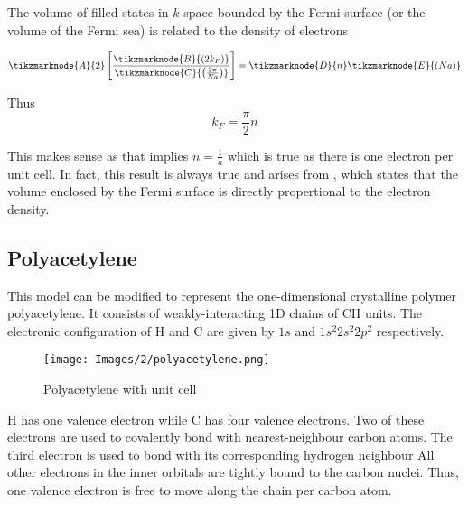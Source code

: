 \documentclass[12pt,a4paper,titlepage]{article}
\newcommand{\ul}[1]{\underline{\smash{#1}}} %
\begin{document}
The volume of filled states in $k$-space bounded by the Fermi surface (or the volume of the Fermi sea) is related to the density of electrons

\begin{equation}
	\tikzmarknode{A}{2}\left[\frac{\tikzmarknode{B}{(2k_{F})}}{\tikzmarknode{C}{\left(\frac{2\pi}{Na}\right)}}\right]=\tikzmarknode{D}{n}\tikzmarknode{E}{(Na)}
\end{equation}

Thus
\begin{equation}
k_{F}=\frac{\pi}{2}n
\end{equation}

This makes sense as that implies $n=\frac{1}{a}$ which is true as there is one electron per unit cell. In fact, this result is always true and arises from \ul{Luttinger's theorem}, which states that the volume enclosed by the Fermi surface is directly propertional to the electron density.

\subsection{Polyacetylene}
This model can be modified to represent the one-dimensional crystalline polymer polyacetylene. It consists of weakly-interacting 1D chains of CH units.  The electronic configuration of H and C are given by $1s$ and $1s^{2}2s^{2}2p^{2}$ respectively.

\begin{figure}[H]
	\centering
	\texttt{[image: Images/2/polyacetylene.png]}
	\caption{Polyacetylene with unit cell}
\end{figure}
H has one valence electron while C has four valence electrons. Two of these electrons are used to covalently bond with nearest-neighbour carbon atoms. The third electron is used to bond with its corresponding hydrogen neighbour All other electrons in the inner orbitals are tightly bound to the carbon nuclei. Thus, one valence electron is free to move along the chain per carbon atom.\bigskip
\end{document}
